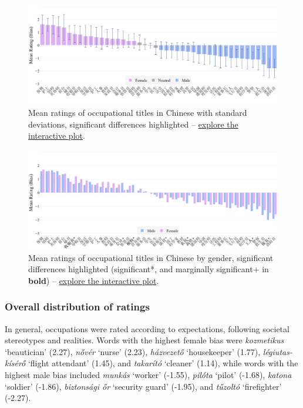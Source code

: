 \documentclass[11pt]{article}
\begin{document}
\begin{figure}[!ht]
  \centering
  \includegraphics[width=\linewidth]{../occupations_zh}
  \caption{Mean ratings of occupational titles in Chinese with standard deviations, significant differences highlighted -- \href{https://htmlpreview.github.io/?https://github.com/partigabor/occupational-bias/blob/main/occupations_zh.html}{explore the interactive plot}.}
  \label{fig:occupations_zh}
\end{figure}

\begin{figure}[tbp]
  \centering
  \includegraphics[width=\linewidth]{../occupations_zh_gender}
  \caption{Mean ratings of occupational titles in Chinese by gender, significant differences highlighted (significant*, and marginally significant+ in \textbf{bold}) -- \href{https://htmlpreview.github.io/?https://github.com/partigabor/occupational-bias/blob/main/occupations_zh_gender.html}{explore the interactive plot}.}
  \label{fig:occupations_zh_gender}
\end{figure}

\subsubsection{Overall distribution of ratings}

In general, occupations were rated according to expectations, following societal stereotypes and realities. Words with the highest female bias were \textit{kozmetikus} `beautician' (2.27), \textit{nővér} `nurse' (2.23), \textit{házvezető} `housekeeper' (1.77), \textit{légiutas-kísérő} `flight attendant' (1.45), and \textit{takarító} `cleaner' (1.14), while words with the highest male bias included \textit{munkás} `worker' (-1.55), \textit{pilóta} `pilot' (-1.68), \textit{katona} `soldier' (-1.86), \textit{biztonsági őr} `security guard' (-1.95), and \textit{tűzoltó} `firefighter' (-2.27).
\end{document}
